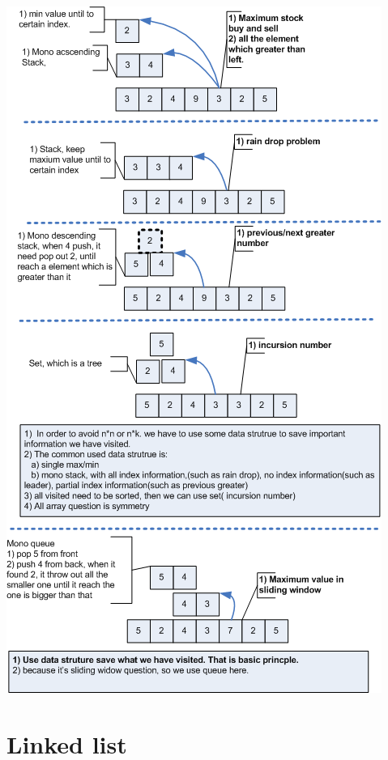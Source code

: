\documentclass[a4paper,11pt,twoside]{book}
\begin{document}
\begin{center}
	\includegraphics[scale=0.64]{pics/array.png} \newline
\end{center}
	
\section{Linked list}
\end{document}
